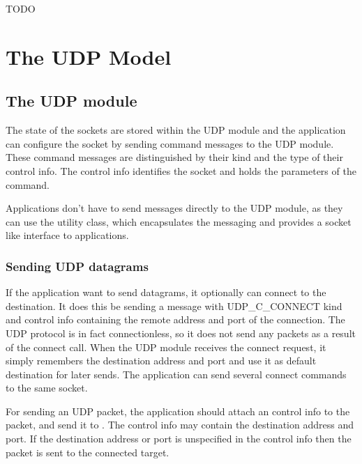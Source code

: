 \ifdraft TODO

\chapter{The UDP Model}
\label{cha:udp}

\section{The UDP module}

The state of the sockets are stored within the UDP module and the application
can configure the socket by sending command messages to the UDP module.
These command messages are distinguished by their kind and the type of their
control info. The control info identifies the socket and holds the parameters
of the command.

Applications don't have to send messages directly to the UDP module,
as they can use the  utility class, which encapsulates the messaging and
provides a socket like interface to applications.

\subsection{Sending UDP datagrams}

If the application want to send datagrams, it optionally can connect to the destination.
It does this be sending a message with UDP\_C\_CONNECT kind and 
control info containing the remote address and port of the connection.
The UDP protocol is in fact connectionless, so it does not send any packets as a result
of the connect call. When the UDP module receives the connect request,
it simply remembers the destination address and port and use it as default destination
for later sends. The application can send several connect commands to the same socket.



For sending an UDP packet, the application should attach an 
control info to the packet, and send it to . The control info may contain
the destination address and port. If the destination address or port
is unspecified in the control info then the packet is sent to the connected target.


